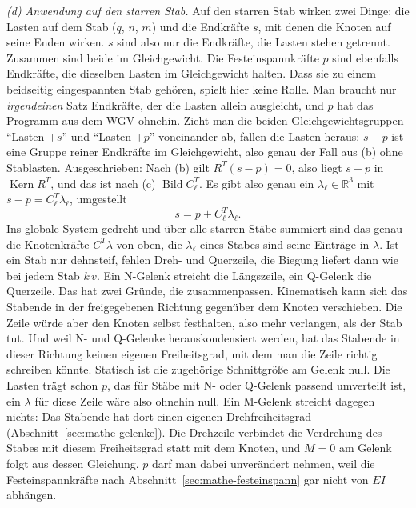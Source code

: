 \emph{(d) Anwendung auf den starren Stab.} Auf den starren Stab wirken zwei Dinge: die Lasten auf
dem Stab ($q$, $n$, $m$) und die Endkräfte $s$, mit denen die Knoten auf seine Enden wirken. $s$
sind also nur die Endkräfte, die Lasten stehen getrennt. Zusammen sind beide im Gleichgewicht.
Die Festeinspannkräfte $p$ sind ebenfalls Endkräfte, die dieselben Lasten im Gleichgewicht
halten. Dass sie zu einem beidseitig eingespannten Stab gehören, spielt hier keine Rolle. Man
braucht nur \emph{irgendeinen} Satz Endkräfte, der die Lasten allein ausgleicht, und $p$ hat das
Programm aus dem WGV ohnehin. Zieht man die beiden Gleichgewichtsgruppen
\enquote{Lasten $+ s$} und \enquote{Lasten $+ p$} voneinander ab, fallen die Lasten heraus: $s - p$
ist eine Gruppe reiner Endkräfte im Gleichgewicht, also genau der Fall aus (b) ohne Stablasten.
Ausgeschrieben: Nach (b) gilt $R^T (s - p) = 0$, also liegt
$s - p$ in $\operatorname{Kern} R^T$, und das ist nach (c) $\operatorname{Bild} C_\ell^T$. Es gibt
also genau ein $\lambda_\ell \in \mathbb R^3$ mit $s - p = C_\ell^T \lambda_\ell$, umgestellt
\[
  s = p + C_\ell^T \lambda_\ell .
\]
Ins globale System gedreht und über alle starren Stäbe summiert sind das genau die Knotenkräfte
$C^T\lambda$ von oben, die $\lambda_\ell$ eines Stabes sind seine Einträge in $\lambda$. Ist ein Stab
nur dehnsteif, fehlen Dreh- und Querzeile, die Biegung liefert dann wie bei jedem Stab $k\,v$.
Ein N-Gelenk streicht die Längszeile, ein Q-Gelenk die Querzeile. Das hat zwei Gründe, die
zusammenpassen. Kinematisch kann sich das Stabende in der freigegebenen Richtung gegenüber dem
Knoten verschieben. Die Zeile würde aber den Knoten selbst festhalten, also mehr verlangen, als der
Stab tut. Und weil N- und Q-Gelenke herauskondensiert werden, hat das Stabende in dieser Richtung
keinen eigenen Freiheitsgrad, mit dem man die Zeile richtig schreiben könnte. Statisch ist die
zugehörige Schnittgröße am Gelenk null. Die Lasten trägt schon $p$, das für Stäbe mit N- oder
Q-Gelenk passend umverteilt ist, ein $\lambda$ für diese Zeile wäre also ohnehin null. Ein
M-Gelenk streicht dagegen nichts: Das Stabende hat dort einen eigenen Drehfreiheitsgrad
(Abschnitt~\ref{sec:mathe-gelenke}). Die Drehzeile verbindet die Verdrehung des Stabes mit diesem
Freiheitsgrad statt mit dem Knoten, und $M = 0$ am Gelenk folgt aus dessen Gleichung. $p$ darf man dabei unverändert nehmen, weil die
Festeinspannkräfte nach Abschnitt~\ref{sec:mathe-festeinspann} gar nicht von $EI$ abhängen.

